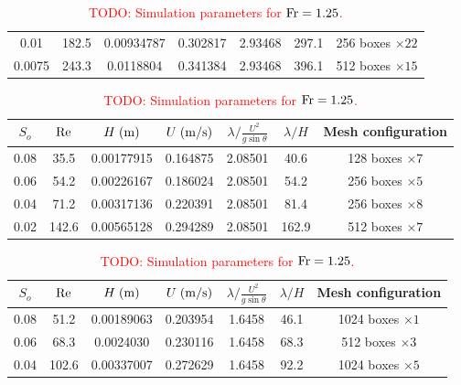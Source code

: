 \documentclass[a4paper]{article}
\newcommand{\fr}{{\rm{Fr}}}
\newcommand{\sa}{\sin\theta}
\begin{document}
\begin{table}[htbp]
\begin{subtable}{1\textwidth}
\begin{tabular}{ccccccc}
			0.01 & 182.5 & 0.00934787 & 0.302817 & 2.93468 & 297.1 & 256 boxes $\times 22$\\
			
			0.0075 & 243.3 & 0.0118804 & 0.341384 & 2.93468 & 396.1 & 512 boxes $\times 15$\\
			\bottomrule 
		\end{tabular}
		\caption{Simulation parameters for $\fr=1.00$.}
		\label{params_1}
	\end{subtable}

	\vspace{0.25cm}
	
	\begin{subtable}{1\textwidth}
		\centering
		\begin{tabular}{ccccccc}
			$S_o$ & $\rm Re$ & $H\;{\rm (m)}$ & $U\;{\rm (m/s)}$ & $\lambda/\frac{U^2}{g\sa}$ & $\lambda/H$ & Mesh configuration\\
			\toprule
			0.08 & 35.5 & 0.00177915 & 0.164875 & 2.08501 & 40.6 & 128 boxes $\times 7$\\
			
			0.06 & 54.2 & 0.00226167 & 0.186024 & 2.08501 & 54.2 & 256 boxes $\times 5$\\
			
			0.04 & 71.2 & 0.00317136 & 0.220391 & 2.08501 & 81.4 & 256 boxes $\times 8$\\
			
			0.02 & 142.6 & 0.00565128 & 0.294289 & 2.08501 & 162.9 & 512 boxes $\times 7$\\
			\bottomrule 
		\end{tabular}
		\caption{\textcolor{red}{TODO: Simulation parameters for $\fr=1.25$.}}
		\label{params_125}
	\end{subtable}
	
	\vspace{0.25cm}

	\begin{subtable}{1\textwidth}
		\centering
		\begin{tabular}{ccccccc}
			$S_o$ & $\rm Re$ & $H\;{\rm (m)}$ & $U\;{\rm (m/s)}$ & $\lambda/\frac{U^2}{g\sa}$ & $\lambda/H$ & Mesh configuration\\
			\toprule
			0.08 & 51.2 & 0.00189063 & 0.203954 & 1.6458 & 46.1 & 1024 boxes $\times 1$\\
			
			0.06 & 68.3 & 0.0024030 & 0.230116 & 1.6458 & 68.3 & 512 boxes $\times 3$\\
			
			0.04 & 102.6 & 0.00337007 & 0.272629 & 1.6458 & 92.2 & 1024 boxes $\times 5$\\
			

\end{tabular}
\end{subtable}
\end{table}
\end{document}
